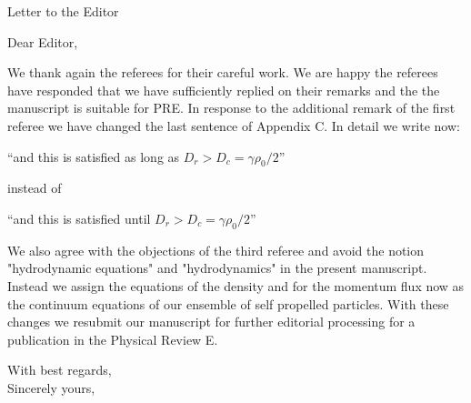 \documentclass[a4paper,11pt]{letter}
\newcommand{\hl}[1]{\textcolor{hlcolor}{#1}}
\begin{document}
\longindentation=0pt

\signature{Hamid Seyed-Allaei (in the name of the co-autors)}
\address{Sharif University of Technology \\ Azadi Avenue \\ Tehran, Iran}

\date{\today}


\begin{letter}{Letter to the Editor}


\opening{Dear Editor,}

We thank again the referees for their careful work. We are happy the referees have responded that we have sufficiently replied on their remarks and the the manuscript is suitable for PRE. 
In response to the additional remark of the first referee we have changed the last sentence of Appendix C. In detail we write  now:

``and this is satisfied \hl{as long as} $D_r > D_c = \gamma \rho_0 / 2$''

instead of 

``and this is satisfied \hl{until} $D_r > D_c = \gamma \rho_0 / 2$''

We also agree with  the objections of the third referee and avoid the notion "hydrodynamic equations" and "hydrodynamics" in the present manuscript. Instead we assign  the equations of the density and for the momentum flux now as the continuum equations of our ensemble of self propelled particles. 
With these changes we resubmit our manuscript for further editorial processing for a publication in the Physical Review E.


\closing{With best regards,\\ Sincerely yours,}

\end{letter}
\end{document}
